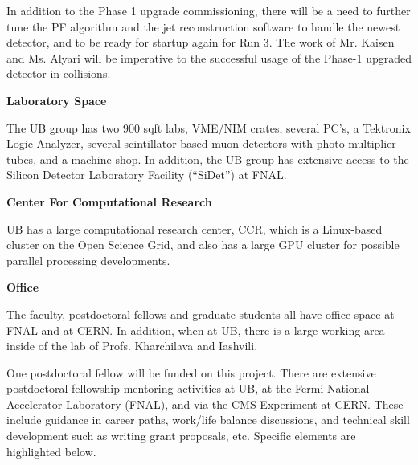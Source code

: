 \documentclass[12pt]{proposalnsf}
\begin{document}
In addition to the Phase 1 upgrade commissioning, there will be a need
to further tune the PF
algorithm and the jet reconstruction software to handle the newest
detector, and to be ready for startup again for Run 3. The work of
Mr. Kaisen and Ms. Alyari will be imperative to the successful usage
of the Phase-1 upgraded detector in collisions. 


\newpage
{}
\renewcommand{\thepage} {C--\arabic{page}}

\bigskip
{\bf Laboratory Space}

The UB group has two 900 sqft labs, VME/NIM crates,
several PC's, a Tektronix Logic Analyzer, several scintillator-based
muon detectors with photo-multiplier tubes, and a machine shop. 
In addition, the UB group has extensive access to the Silicon
Detector Laboratory Facility (``SiDet'') at FNAL. 

\bigskip
{\bf Center For Computational Research}

UB has a large computational research center, CCR, which is a
Linux-based cluster on the Open Science Grid, and also has a large GPU
cluster for possible parallel processing developments. 

\bigskip
{\bf Office}

The faculty, postdoctoral fellows and graduate students all have
office space at FNAL and at CERN. In addition, when at UB,
there is a large working area inside of the lab of Profs. Kharchilava
and Iashvili. 


\newpage
{}
\renewcommand{\thepage} {D--\arabic{page}}

One postdoctoral fellow will be funded on this project. There are
extensive postdoctoral fellowship mentoring activities at UB, at the
Fermi National Accelerator Laboratory (FNAL), and via the CMS
Experiment at CERN. These include guidance in career paths,
work/life balance discussions, and technical skill development such as
writing grant proposals, etc. Specific elements are highlighted
below. 
\end{document}
